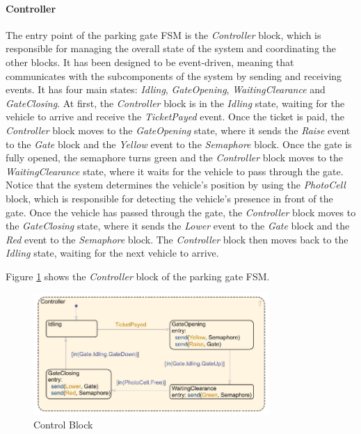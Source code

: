 \paragraph{Controller}

The entry point of the parking gate FSM is the \textit{Controller} block, which is responsible for managing the overall state of the system and coordinating the other blocks.
It has been designed to be event-driven, meaning that communicates with the subcomponents of the system by sending and receiving events.
It has four main states: \textit{Idling}, \textit{GateOpening}, \textit{WaitingClearance} and \textit{GateClosing}.
At first, the \textit{Controller} block is in the \textit{Idling} state, waiting for the vehicle to arrive and receive the \textit{TicketPayed} event.
Once the ticket is paid, the \textit{Controller} block moves to the \textit{GateOpening} state, where it sends the \textit{Raise} event to the \textit{Gate} block and the \textit{Yellow} event to the \textit{Semaphore} block.
Once the gate is fully opened, the semaphore turns green and the \textit{Controller} block moves to the \textit{WaitingClearance} state, where it waits for the vehicle to pass through the gate.
Notice that the system determines the vehicle's position by using the \textit{PhotoCell} block, which is responsible for detecting the vehicle's presence in front of the gate.
Once the vehicle has passed through the gate, the \textit{Controller} block moves to the \textit{GateClosing} state, where it sends the \textit{Lower} event to the \textit{Gate} block and the \textit{Red} event to the \textit{Semaphore} block.
The \textit{Controller} block then moves back to the \textit{Idling} state, waiting for the next vehicle to arrive.

Figure \ref{fig:control_block} shows the \textit{Controller} block of the parking gate FSM.

\begin{figure}[H]
    \centering
    \includegraphics[width=0.8\textwidth]{./img/MATLAB/control_block.pdf}
    \caption{Control Block}
    \label{fig:control_block}
\end{figure}


